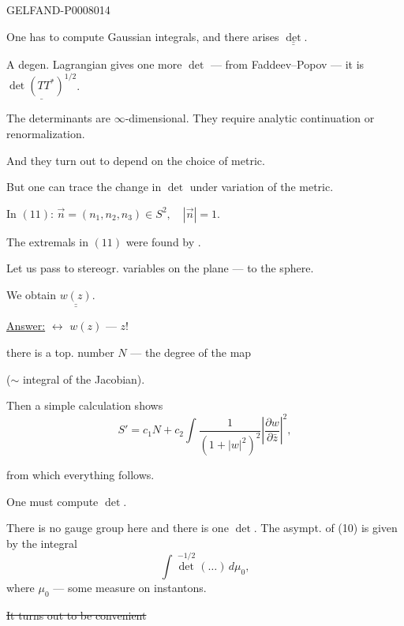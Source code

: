 \begin{GelfandAdjacentEvidence}{GELFAND-P000801}{4}


One has to compute Gaussian integrals, and there arises \(\underline{\underline{\det}}\).

A degen. Lagrangian gives one more \(\det\) --- from Faddeev–Popov --- it is \(\underline{\det(TT^*)^{1/2}}\).

The determinants are \(\infty\)-dimensional. They require analytic continuation or renormalization.

And they turn out to depend on the choice of metric.

But one can trace the change in \(\det\) under variation of the metric.

In \((11)\): \(\vec n=(n_1,n_2,n_3)\in S^2,\quad |\vec n|=1\).

The extremals in \((11)\) were found by .

Let us pass to stereogr. variables on the plane --- to the sphere.

We obtain \(\underline{\underline{w(z)}}\).

\underline{Answer:} 
\(\leftrightarrow\) \(w(z)\) ---  \(z\)!

 there is a top. number \(N\) --- the degree of the map

(\(\sim\) integral of the Jacobian).

Then a simple calculation shows
\begin{equation*}
S'=c_1N+c_2\int\frac{1}{(1+|w|^2)^2}
\left|\frac{\partial w}{\partial\bar z}\right|^2,
\tag{12}
\end{equation*}
\end{GelfandAdjacentEvidence}


from which everything follows.

One must compute \(\det\).

There is no gauge group here and there is one \(\det\). The asympt. of (10) is given by the integral
\begin{equation*}
\int\det^{-1/2}(\ldots)\,d\mu_0,
\tag{13}
\end{equation*}
where \(\mu_0\) --- some measure on instantons.

\sout{It turns out to be convenient}

